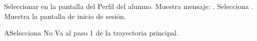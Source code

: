
\begin{UCtrayectoria}
	
	\UCpaso [\UCactor]	Seleccionar  en la pantalla del Perfil del alumno. 
	\UCpaso [\UCsist]Muestra mensaje: .
	\UCpaso [\UCactor]Selecciona .
	\UCpaso [\UCsist]Muestra la pantalla de inicio de sesión.
\end{UCtrayectoria}



\begin{UCtrayectoriaA}{A}{Selecciona No}
	\UCpaso Va al paso 1 de la trayectoria principal.
\end{UCtrayectoriaA}

